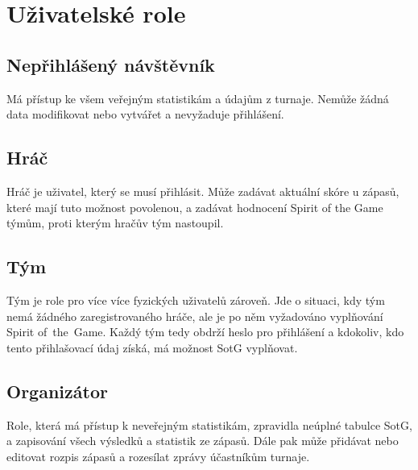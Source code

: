 \documentclass[thesis=B,czech]{FITthesis}[2012/06/26]
\begin{document}
\section{Uživatelské role}


\subsection{Nepřihlášený návštěvník}

\indent

Má přístup ke všem veřejným statistikám a údajům z turnaje. Nemůže žádná data modifikovat
nebo vytvářet a nevyžaduje přihlášení.

\subsection{Hráč}


\indent

Hráč je uživatel, který se musí přihlásit. Může zadávat aktuální skóre u zápasů,
které mají tuto možnost povolenou, a zadávat hodnocení Spirit of the Game týmům, proti kterým hračův tým nastoupil.

\subsection{Tým}

\indent

Tým je role pro více více fyzických uživatelů zároveň. Jde o situaci, kdy tým nemá žádného zaregistrovaného hráče,
ale je po něm vyžadováno vyplňování Spirit of~the~Game. Každý tým tedy obdrží heslo pro přihlášení a kdokoliv,
kdo tento přihlašovací údaj získá, má možnost SotG vyplňovat.

\subsection{Organizátor}

\indent

Role, která má přístup k neveřejným statistikám, zpravidla neúplné tabulce SotG, a zapisování všech výsledků a statistik ze zápasů.
Dále pak může přidávat nebo editovat rozpis zápasů a rozesílat zprávy účastníkům turnaje.
\end{document}
